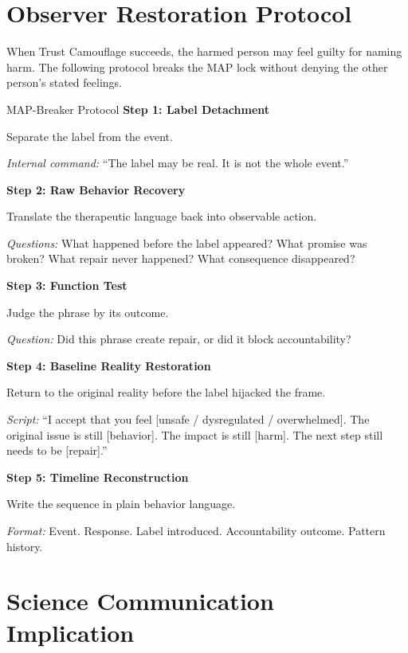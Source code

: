 \documentclass[11pt, letterpaper]{article}
\newcommand{\term}[1]{\textbf{#1}}
\begin{document}
\section{Observer Restoration Protocol}

When Trust Camouflage succeeds, the harmed person may feel guilty for naming harm. The following protocol breaks the MAP lock without denying the other person's stated feelings.

\begin{frameworkbox}{MAP-Breaker Protocol}
\term{Step 1: Label Detachment}

Separate the label from the event.

\textit{Internal command:} ``The label may be real. It is not the whole event.''

\vspace{0.7em}
\term{Step 2: Raw Behavior Recovery}

Translate the therapeutic language back into observable action.

\textit{Questions:} What happened before the label appeared? What promise was broken? What repair never happened? What consequence disappeared?

\vspace{0.7em}
\term{Step 3: Function Test}

Judge the phrase by its outcome.

\textit{Question:} Did this phrase create repair, or did it block accountability?

\vspace{0.7em}
\term{Step 4: Baseline Reality Restoration}

Return to the original reality before the label hijacked the frame.

\textit{Script:} ``I accept that you feel [unsafe / dysregulated / overwhelmed]. The original issue is still [behavior]. The impact is still [harm]. The next step still needs to be [repair].''

\vspace{0.7em}
\term{Step 5: Timeline Reconstruction}

Write the sequence in plain behavior language.

\textit{Format:} Event. Response. Label introduced. Accountability outcome. Pattern history.
\end{frameworkbox}

\section{Science Communication Implication}
\end{document}
